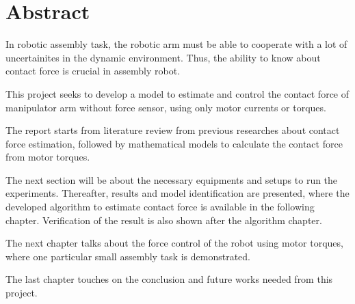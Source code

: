 \chapter*{Abstract}

In robotic assembly task, the robotic arm must be able to cooperate with a lot of uncertainites in the dynamic environment. Thus, the ability to know about contact force is crucial in assembly robot.

This project seeks to develop a model to estimate and control the contact force of manipulator arm without force sensor, using only motor currents or torques.

The report starts from literature review from previous researches about contact force estimation, followed by mathematical models to calculate the contact force from motor torques. 

The next section will be about the necessary equipments and setups to run the experiments. Thereafter, results and model identification are presented, where the developed algorithm to estimate contact force is available in the following chapter. Verification of the result is also shown after the algorithm chapter. 

The next chapter talks about the force control of the robot using motor torques, where one particular small assembly task is demonstrated.

The last chapter touches on the conclusion and future works needed from this project.
